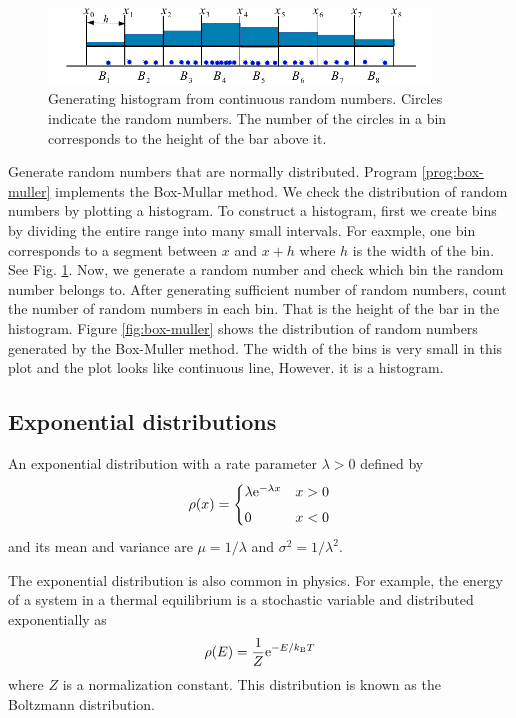 \begin{example}

\begin{figure}
\centering
\includegraphics[width=4in]{15.Random-Numbers/histogram.pdf}
\caption{Generating histogram from continuous random numbers.  Circles indicate the random numbers.  The number of the circles in a bin corresponds to the height of the bar above it.}\label{fig:histogram}
\end{figure}

Generate random numbers that are normally distributed.  Program \ref{prog:box-muller} implements the Box-Mullar method.
We check the distribution of random numbers by plotting a histogram. 
To construct a histogram, first we create bins by dividing the entire range into many small intervals.  For eaxmple, one bin corresponds to a segment between $x$ and $x+h$ where $h$ is the width of the bin.  See Fig. \ref{fig:histogram}. 
Now, we generate a random number and check which bin the random number belongs to.  After generating sufficient number of random numbers, count the number of random numbers in each bin.  That is the height of the bar in the histogram.
  Figure \ref{fig:box-muller} shows the distribution of random numbers generated by  the Box-Muller method. The width of the bins is
   very small in this plot and the plot looks like continuous line,  However. it is a histogram.
\end{example}


\noindent
\subsection{Exponential distributions}

An exponential distribution with a rate parameter $\lambda>0$ defined by
\begin{equation}\label{eq:exp_dist}
\rho(x) = \begin{cases} \lambda \text{e}^{-\lambda x} & x > 0 \\[1ex]
0 & x < 0 \end{cases}
\end{equation}
and its mean and variance are $\mu=1/\lambda$ and $\sigma^2=1/\lambda^2$.

The exponential distribution is also common in physics. For example, the energy of a system in a thermal equilibrium is a stochastic variable and distributed exponentially as
\begin{equation}
\rho(E) = \frac{1}{Z} \text{e}^{-E/k_\text{B} T}
\end{equation}
where $Z$ is a normalization constant. This distribution is known as the  Boltzmann distribution. 

